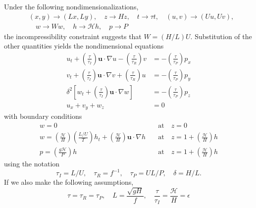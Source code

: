 \documentclass[letterpaper, 11pt]{article}
\begin{document}
Under the following nondimensionalizations,
\begin{equation}
\begin{split}
& (x, y) \rightarrow (Lx, Ly), \quad z \rightarrow H z, \quad t \rightarrow \tau t, \quad (u, v) \rightarrow (Uu, Uv), \\
& \quad w \rightarrow W w, \quad h \rightarrow \mathcal{H} h, \quad p \rightarrow P
\end{split}
\end{equation}
the incompressibility constraint suggests that $W = (H / L) U$. Substitution of the other quantities yields the nondimensional equations
\begin{subequations}
\begin{align}
u_t + \left(\frac{\tau}{\tau_I}\right) \mathbf{u} \cdot \nabla u - \left(\frac{\tau}{\tau_R}\right) v &= - \left(\frac{\tau}{\tau_P}\right) p_x \\
v_t + \left(\frac{\tau}{\tau_I}\right) \mathbf{u} \cdot \nabla v + \left(\frac{\tau}{\tau_R}\right) u &= - \left(\frac{\tau}{\tau_P}\right) p_y \\
\delta^2 \left[ w_t + \left(\frac{\tau}{\tau_I}\right) \mathbf{u} \cdot \nabla w \right] &= - \left(\frac{\tau}{\tau_P}\right) p_z \\
u_x + v_y + w_z &= 0
\end{align}
\end{subequations}
with boundary conditions
\begin{subequations}
\begin{align}
w = 0 &\quad \mathrm{at} \quad z = 0 \\
w = \left(\frac{\mathcal{H}}{H} \right) \left( \frac{L/U}{T} \right) h_t + \left(\frac{\mathcal{H}}{H}\right) \mathbf{u} \cdot \nabla h &\quad \mathrm{at} \quad z = 1 + \left(\frac{\mathcal{H}}{H}\right) h \\
p = \left( \frac{g \mathcal{H}}{P} \right) h &\quad \mathrm{at} \quad z = 1 + \left(\frac{\mathcal{H}}{H}\right) h
\end{align}
\end{subequations}
using the notation
\begin{equation}
\tau_I = L / U, \quad \tau_R = f^{-1}, \quad \tau_P = UL / P, \quad \delta = H / L.
\end{equation}
If we also make the following assumptions,
\begin{equation}
\tau = \tau_R = \tau_P, \quad L = \frac{\sqrt{gH}}{f}, \quad \frac{\tau}{\tau_I} = \frac{\mathcal{H}}{H} = \epsilon
\end{equation}
\end{document}
